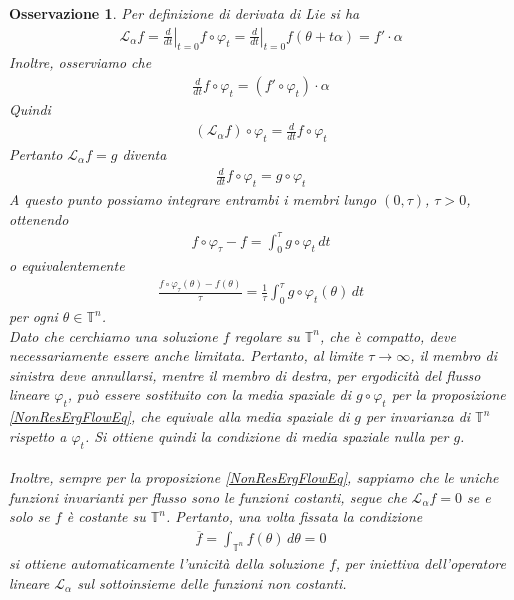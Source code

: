 \documentclass[twoside, 11pt]{amsbook}
\newcommand{\0}{{(0)}}
\newcommand{\3}{{(3)}}
\theoremstyle{colonplain}
\theoremstyle{colondefinition}
\theoremstyle{colonremark}
\newtheorem{rmk}[thm]{Osservazione}
\numberwithin{equation}{chapter}
\begin{document}
\begin{rmk}
Per definizione di derivata di Lie si ha
\begin{align}
    \mathcal{L}_\alpha f = \left.\frac{d}{dt}\right|_{t = 0} f \circ \varphi_t = \left.\frac{d}{dt}\right|_{t = 0} f(\theta + t\alpha) = f' \cdot \alpha
\end{align}
Inoltre, osserviamo che
\begin{align}
    \frac{d}{dt} f \circ \varphi_t = (f' \circ \varphi_t) \cdot \alpha
\end{align}
Quindi
\begin{align}
    (\mathcal{L}_\alpha f) \circ \varphi_t = \frac{d}{dt} f \circ \varphi_t
\end{align}
Pertanto $\mathcal{L}_\alpha f = g$ diventa
\begin{align}
    \frac{d}{dt} f \circ \varphi_t = g \circ \varphi_t
\end{align}
A questo punto possiamo integrare entrambi i membri lungo $(0, \tau)$, $\tau > 0$, ottenendo
\begin{align}
    f \circ \varphi_\tau - f = \int_0^\tau g \circ \varphi_t \, dt
\end{align}
o equivalentemente
\begin{align}
    \frac{f \circ \varphi_\tau (\theta) - f(\theta)}{\tau} = \frac{1}{\tau}\int_0^\tau g \circ \varphi_t(\theta) \, dt
\end{align}
per ogni $\theta \in \mathbb{T}^n$. \\
Dato che cerchiamo una soluzione $f$ regolare su $\mathbb{T}^n$, che è compatto, deve necessariamente essere anche limitata. Pertanto, al limite $\tau \rightarrow \infty$, il membro di sinistra deve annullarsi, mentre il membro di destra, per ergodicità del flusso lineare $\varphi_t$, può essere sostituito con la media spaziale di $g \circ \varphi_t$ per la proposizione \ref{NonResErgFlowEq}, che equivale alla media spaziale di $g$ per invarianza di $\mathbb{T}^n$ rispetto a $\varphi_t$. Si ottiene quindi la condizione di media spaziale nulla per $g$. \\ \\
Inoltre, sempre per la proposizione \ref{NonResErgFlowEq}, sappiamo che le uniche funzioni invarianti per flusso sono le funzioni costanti, segue che $\mathcal{L}_\alpha f = 0$ se e solo se $f$ è costante su $\mathbb{T}^n$. Pertanto, una volta fissata la condizione
\begin{align}
    \overline{f} = \int_{\mathbb{T}^n} f(\theta) \, d\theta = 0
\end{align}
si ottiene automaticamente l'unicità della soluzione $f$, per iniettiva dell'operatore lineare $\mathcal{L}_\alpha$ sul sottoinsieme delle funzioni non costanti.
\end{rmk}
\end{document}

